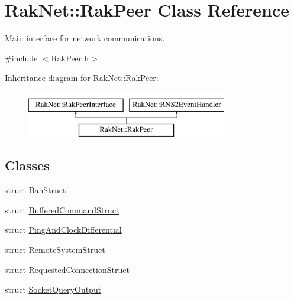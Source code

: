 \hypertarget{class_rak_net_1_1_rak_peer}{\section{Rak\-Net\-:\-:Rak\-Peer Class Reference}
\label{class_rak_net_1_1_rak_peer}
}


Main interface for network communications.  




{\ttfamily \#include $<$Rak\-Peer.\-h$>$}

Inheritance diagram for Rak\-Net\-:\-:Rak\-Peer\-:\begin{figure}[H]
\begin{center}
\leavevmode
\includegraphics[height=2.000000cm]{class_rak_net_1_1_rak_peer}
\end{center}
\end{figure}
\subsection*{Classes}
\begin{DoxyCompactItemize}
\item 
struct \hyperlink{struct_rak_net_1_1_rak_peer_1_1_ban_struct}{Ban\-Struct}
\item 
struct \hyperlink{struct_rak_net_1_1_rak_peer_1_1_buffered_command_struct}{Buffered\-Command\-Struct}
\item 
struct \hyperlink{struct_rak_net_1_1_rak_peer_1_1_ping_and_clock_differential}{Ping\-And\-Clock\-Differential}
\item 
struct \hyperlink{struct_rak_net_1_1_rak_peer_1_1_remote_system_struct}{Remote\-System\-Struct}
\item 
struct \hyperlink{struct_rak_net_1_1_rak_peer_1_1_requested_connection_struct}{Requested\-Connection\-Struct}
\item 
struct \hyperlink{struct_rak_net_1_1_rak_peer_1_1_socket_query_output}{Socket\-Query\-Output}
\end{DoxyCompactItemize}
